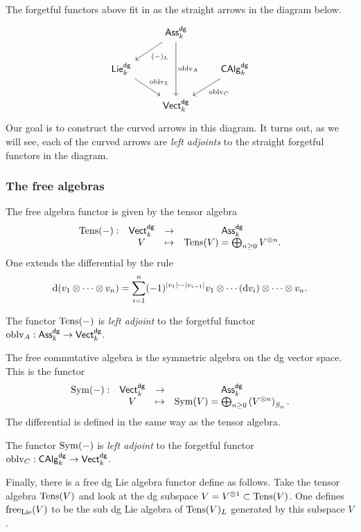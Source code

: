 \documentclass[11pt]{amsart}
\def\dgVect{{\sf Vect}^{\sf dg}}
\def\dgLie{{\sf Lie}^{\sf dg}}
\def\dgAss{{\sf Ass}^{\sf dg}}
\def\dgCAlg{{\sf CAlg}^{\sf dg}}
\def\cdga{{\sf CAlg}^{\sf dg}}
\begin{document}
The forgetful functors above fit in as the straight arrows in the diagram below. 
\[
\begin{tikzcd}
& \dgAss_k \ar[dd, "\oblv_A"] \ar[dl, "(-)_L"] & \\
\dgLie_k \ar[dr, "\oblv_L"] & &  \cdga_k \ar[dl,"\oblv_C"] \\
& \dgVect_k & 
\end{tikzcd}
\]
Our goal is to construct the curved arrows in this diagram. 
It turns out, as we will see, each of the curved arrows are {\em left adjoints} to the straight forgetful functors in the diagram. 

\subsubsection{The free algebras}

The free algebra functor is given by the tensor algebra 
\[
\begin{array}{cccc}
\Tens(-) : & \dgVect_k & \to & \dgAss_k \\
& V & \mapsto & \Tens(V) = \bigoplus_{n \geq 0} V^{\tensor n} . 
\end{array}
\]
One extends the differential by the rule
\[
{\rm d}(v_1 \otimes \cdots \otimes v_n) = \sum_{i = 1}^n (-1)^{|v_1|\cdots |v_{i-1}|} v_1 \otimes \cdots ({\rm d} v_{i}) \otimes \cdots \otimes v_n .
\]

\begin{fact}
The functor ${\rm Tens}(-)$ is {\em left adjoint} to the forgetful functor $\oblv_A : \dgAss_k \to \dgVect_k$. 
\end{fact}

The free commutative algebra is the symmetric algebra on the dg vector space. 
This is the functor
\[
\begin{array}{cccc}
\Sym(-) : & \dgVect_k & \to & \dgAss_k \\
& V & \mapsto & \Sym (V) = \bigoplus_{n \geq 0} \left(V^{\tensor n}\right)_{S_n} . 
\end{array}
\]
The differential is defined in the same way as the tensor algebra. 

\begin{fact}
The functor ${\rm Sym}(-)$ is {\em left adjoint} to the forgetful functor $\oblv_C : \dgCAlg_k \to \dgVect_k$.
\end{fact}

Finally, there is a free dg Lie algebra functor define as follows. 
Take the tensor algebra ${\rm Tens}(V)$ and look at the dg subspace $V = V^{\otimes 1} \subset {\rm Tens}(V)$. 
One defines ${\rm free}_{\rm Lie}(V)$ to be the sub dg Lie algebra of ${\rm Tens}(V)_L$ generated by this subspace $V$. 
\end{document}
